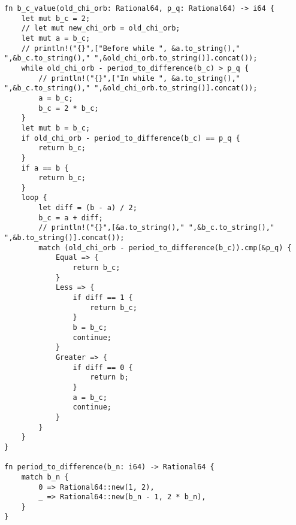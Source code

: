 \begin{lstlisting}
fn b_c_value(old_chi_orb: Rational64, p_q: Rational64) -> i64 {
    let mut b_c = 2;
    // let mut new_chi_orb = old_chi_orb;
    let mut a = b_c;
    // println!("{}",["Before while ", &a.to_string()," ",&b_c.to_string()," ",&old_chi_orb.to_string()].concat());
    while old_chi_orb - period_to_difference(b_c) > p_q {
        // println!("{}",["In while ", &a.to_string()," ",&b_c.to_string()," ",&old_chi_orb.to_string()].concat());
        a = b_c;
        b_c = 2 * b_c;
    }
    let mut b = b_c;
    if old_chi_orb - period_to_difference(b_c) == p_q {
        return b_c;
    }
    if a == b {
        return b_c;
    }
    loop {
        let diff = (b - a) / 2;
        b_c = a + diff;
        // println!("{}",[&a.to_string()," ",&b_c.to_string()," ",&b.to_string()].concat());
        match (old_chi_orb - period_to_difference(b_c)).cmp(&p_q) {
            Equal => {
                return b_c;
            }
            Less => {
                if diff == 1 {
                    return b_c;
                }
                b = b_c;
                continue;
            }
            Greater => {
                if diff == 0 {
                    return b;
                }
                a = b_c;
                continue;
            }
        }
    }
}

fn period_to_difference(b_n: i64) -> Rational64 {
    match b_n {
        0 => Rational64::new(1, 2),
        _ => Rational64::new(b_n - 1, 2 * b_n),
    }
}

\end{lstlisting}

